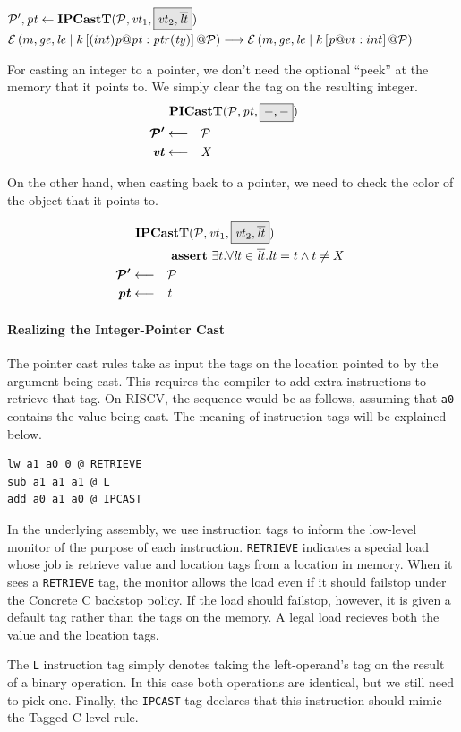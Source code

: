 \documentclass{article}
\begin{document}
            {\(\trule{\PCT',\pt}{\ipcastt{\PCT}{\vt_1}{\vt_2}{\overline{\lt}}}\)}
            {\(\mathcal{E}\left(m,\mathit{ge},\mathit{le} \mid k \left[(int) \mathit{p} @ \mathit{pt} : \mathit{ptr(ty)}\right] @ \mathcal{P}\right) \longrightarrow
              \mathcal{E}\left(m,\mathit{ge},\mathit{le} \mid k \left[\mathit{p} @ vt : int\right] @ \mathcal{P}\right)\)}

For casting an integer to a pointer, we don't need the optional ``peek'' at the memory that it points to.
We simply clear the tag on the resulting integer.
\[\begin{aligned}
\truledef{\picastt{\PCT}{\pt}{-}{-}}
\settag{\PCT'}{\PCT}
\settag{\vt}{X}
\end{aligned}\]

On the other hand, when casting back to a pointer, we need to check the color
of the object that it points to.

\[\begin{aligned}
\truledef{\ipcastt{\PCT}{\vt_1}{\vt_2}{\overline{\lt}}}
\assert{\exists t . \forall \lt \in \overline{\lt} . \lt = t \land t \not = X}
\settag{\PCT'}{\PCT}
\settag{\pt}{t}
\end{aligned}\]

\paragraph{Realizing the Integer-Pointer Cast}

The pointer cast rules take as input the tags on the location pointed to by the
argument being cast. This requires the compiler to add extra instructions to retrieve that tag.
On RISCV, the sequence would be as follows, assuming that {\tt a0} contains the
value being cast. The meaning of instruction tags will be explained below.

\begin{verbatim}
lw a1 a0 0 @ RETRIEVE
sub a1 a1 a1 @ L
add a0 a1 a0 @ IPCAST
\end{verbatim}

In the underlying assembly, we use instruction tags to inform the low-level monitor
of the purpose of each instruction. {\tt RETRIEVE} indicates a special load
whose job is retrieve value and location tags from a location in memory. When it sees
a {\tt RETRIEVE} tag, the monitor allows the load even if it should failstop under the
Concrete C backstop policy. If the load should failstop, however, it is given a default
tag rather than the tags on the memory. A legal load recieves both the value and the location
tags.

The {\tt L} instruction tag simply denotes taking the left-operand's tag on the result of a
binary operation. In this case both operations are identical, but we still need to pick one.
Finally, the {\tt IPCAST} tag declares that this instruction should mimic the Tagged-C-level
rule.
\end{document}
